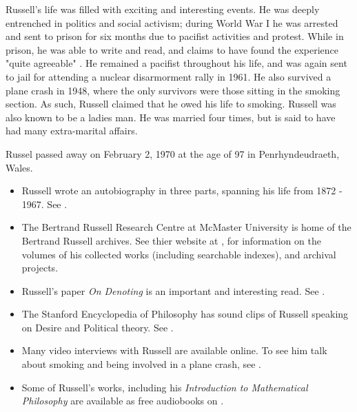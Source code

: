 \documentclass[../../../include/open-logic-section]{subfiles}
\begin{document}
Russell's life was filled with exciting and interesting events. He was
deeply entrenched in politics and social activism; during World War I he
was arrested and sent to prison for six months due to pacifist activities
and protest. While in prison, he was able to write and read, and claims to
have found the experience "quite agreeable" \citet[29]{Russell1968}. He
remained a pacifist throughout his life, and was again sent to jail for
attending a nuclear disarmorment rally in 1961. He also survived a plane
crash in 1948, where the only survivors were those sitting in the smoking
section. As such, Russell claimed that he owed his life to smoking. Russell
was also known to be a ladies man. He was married four times, but is
said to have had many extra-marital affairs.

Russel passed away on February 2, 1970 at the age of 97 in
Penrhyndeudraeth, Wales.

\begin{reading}

\begin{itemize}

\item Russell wrote an autobiography in three parts, spanning his life from
1872 - 1967. See \citet{Russel1967,Russel1968,Russell1969}.

\item The Bertrand Russell Research Centre at McMaster University is home
of the Bertrand Russell archives. See thier website at \citet{Duncan2015},
for information on the volumes of his
collected works (including searchable indexes), and archival projects.

\item Russell's paper \emph{On Denoting} is an important and interesting
read. See \citet{Russell1905}.

\item The Stanford Encyclopedia of Philosophy has sound clips of Russell
speaking on Desire and Political theory. See \citet{Irvine2015}.

\item Many video interviews with Russell are available online. To see him
talk about smoking and being involved in a plane crash, see
\citet{RussellND}.

\item Some of Russell's works, including his \emph{Introduction to
Mathematical Philosophy} are available as free audiobooks on
\citet{LibriVoxND}.

\end{itemize}

\end{reading}
\end{document}
